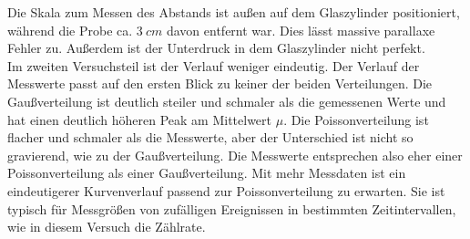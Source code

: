 Die Skala zum Messen des Abstands ist außen auf dem Glaszylinder positioniert, während die Probe ca. $\SI{3}{cm}$ davon entfernt war.
Dies lässt massive parallaxe Fehler zu.
Außerdem ist der Unterdruck in dem Glaszylinder nicht perfekt.
\\Im zweiten Versuchsteil ist der Verlauf weniger eindeutig.
Der Verlauf der Messwerte passt auf den ersten Blick zu keiner der beiden Verteilungen.
Die Gaußverteilung ist deutlich steiler und schmaler als die gemessenen Werte und hat einen deutlich höheren Peak am Mittelwert $\mu$.
Die Poissonverteilung ist flacher und schmaler als die Messwerte, aber der Unterschied ist nicht so gravierend, wie zu der Gaußverteilung.
Die Messwerte entsprechen also eher einer Poissonverteilung als einer Gaußverteilung.
Mit mehr Messdaten ist ein eindeutigerer Kurvenverlauf passend zur Poissonverteilung zu erwarten.
Sie ist typisch für Messgrößen von zufälligen Ereignissen in bestimmten Zeitintervallen, wie in diesem Versuch die Zählrate.

\FloatBarrier

